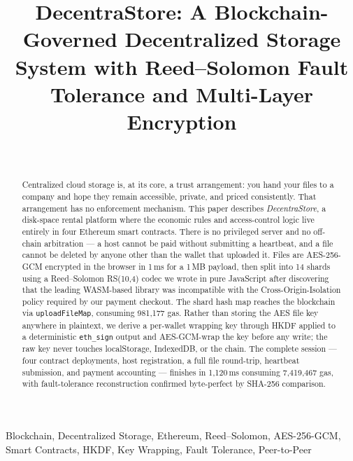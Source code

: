 \documentclass[journal]{IEEEtran}
\newcommand{\FileSizeMB}{1\,MB}
\newcommand{\AESEncryptMs}{1\,ms}
\newcommand{\RSShards}{14}
\newcommand{\RSData}{10}
\newcommand{\RSParity}{4}
\newcommand{\UploadFileMapGas}{981{,}177}
\newcommand{\TotalGas}{7{,}419{,}467}
\newcommand{\TotalTimeMs}{1{,}120\,ms}
\begin{document}
\title{DecentraStore: A Blockchain-Governed Decentralized Storage System
       with Reed--Solomon Fault Tolerance and Multi-Layer Encryption}

\author{\\
}

\maketitle

\begin{abstract}
Centralized cloud storage is, at its core, a trust arrangement: you hand
your files to a company and hope they remain accessible, private, and
priced consistently. That arrangement has no enforcement mechanism.
%
This paper describes \textit{DecentraStore}, a disk-space rental platform
where the economic rules and access-control logic live entirely in four
Ethereum smart contracts. There is no privileged server and no off-chain
arbitration — a host cannot be paid without submitting a heartbeat, and
a file cannot be deleted by anyone other than the wallet that uploaded it.
%
Files are AES-256-GCM encrypted in the browser in \AESEncryptMs{} for a
\FileSizeMB{} payload, then split into \RSShards{} shards using a
Reed--Solomon RS(\RSData{},\RSParity{}) codec we wrote in pure JavaScript
after discovering that the leading WASM-based library was incompatible with
the Cross-Origin-Isolation policy required by our payment checkout.
%
The shard hash map reaches the blockchain via \texttt{uploadFileMap},
consuming \UploadFileMapGas{} gas.
%
Rather than storing the AES file key anywhere in plaintext, we derive a
per-wallet wrapping key through HKDF applied to a deterministic
\texttt{eth\_sign} output and AES-GCM-wrap the key before any write;
the raw key never touches localStorage, IndexedDB, or the chain.
%
The complete session — four contract deployments, host registration, a
full file round-trip, heartbeat submission, and payment accounting —
finishes in \TotalTimeMs{} consuming \TotalGas{} gas, with fault-tolerance
reconstruction confirmed byte-perfect by SHA-256 comparison.
\end{abstract}

\begin{IEEEkeywords}
Blockchain, Decentralized Storage, Ethereum, Reed--Solomon, AES-256-GCM,
Smart Contracts, HKDF, Key Wrapping, Fault Tolerance, Peer-to-Peer
\end{IEEEkeywords}
\end{document}
